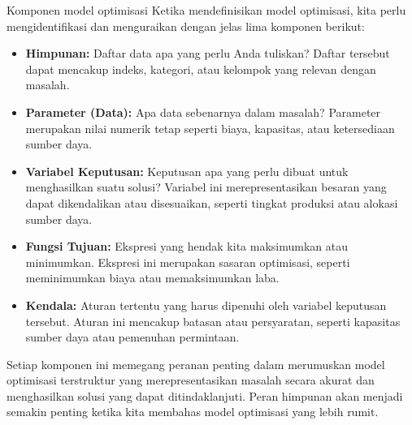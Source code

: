 \begin{definition}{Komponen model optimisasi}
Ketika mendefinisikan model optimisasi, kita perlu mengidentifikasi dan menguraikan dengan jelas lima komponen berikut:

\begin{itemize}
    \item \textbf{Himpunan:} Daftar data apa yang perlu Anda tuliskan? Daftar tersebut dapat mencakup indeks, kategori, atau kelompok yang relevan dengan masalah.
    \item \textbf{Parameter (Data):} Apa data sebenarnya dalam masalah? Parameter merupakan nilai numerik tetap seperti biaya, kapasitas, atau ketersediaan sumber daya.
    \item \textbf{Variabel Keputusan:} Keputusan apa yang perlu dibuat untuk menghasilkan suatu solusi? Variabel ini merepresentasikan besaran yang dapat dikendalikan atau disesuaikan, seperti tingkat produksi atau alokasi sumber daya.
    \item \textbf{Fungsi Tujuan:} Ekspresi yang hendak kita maksimumkan atau minimumkan. Ekspresi ini merupakan sasaran optimisasi, seperti meminimumkan biaya atau memaksimumkan laba.
    \item \textbf{Kendala:} Aturan tertentu yang harus dipenuhi oleh variabel keputusan tersebut. Aturan ini mencakup batasan atau persyaratan, seperti kapasitas sumber daya atau pemenuhan permintaan.
\end{itemize}

Setiap komponen ini memegang peranan penting dalam merumuskan model optimisasi terstruktur yang merepresentasikan masalah secara akurat dan menghasilkan solusi yang dapat ditindaklanjuti. Peran himpunan akan menjadi semakin penting ketika kita membahas model optimisasi yang lebih rumit.
\end{definition}

